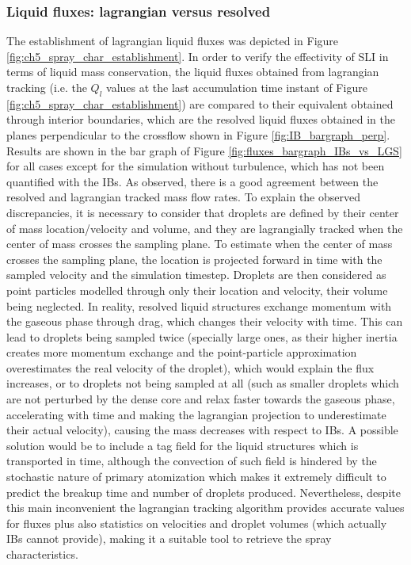 \subsubsection*{Liquid fluxes: lagrangian versus resolved}
\label{subsec:ch5_sli_fluxes_vs_IBs}

The establishment of lagrangian liquid fluxes was depicted in Figure \ref{fig:ch5_spray_char_establishment}. In order to verify the effectivity of SLI in terms of liquid mass conservation, the liquid fluxes obtained from lagrangian tracking (i.e. the $Q_l$ values at the last accumulation time instant of Figure \ref{fig:ch5_spray_char_establishment}) are compared to their equivalent obtained through interior boundaries, which are the resolved liquid fluxes obtained in the planes perpendicular to the crossflow shown in Figure \ref{fig:IB_bargraph_perp}. Results are shown in the bar graph of Figure \ref{fig:fluxes_bargraph_IBs_vs_LGS} for all cases except for the simulation without turbulence, which has not been quantified with the IBs. As observed, there is a good agreement between the resolved and lagrangian tracked mass flow rates. To explain the observed discrepancies, it is necessary to consider that droplets are defined by their center of mass location/velocity and volume, and they are lagrangially tracked when the center of mass crosses the sampling plane. To estimate when the center of mass crosses the sampling plane, the location is projected forward in time with the sampled velocity and the simulation timestep. Droplets are then considered as point particles modelled through only their location and velocity, their volume being neglected. In reality, resolved liquid structures exchange momentum with the gaseous phase through drag, which changes their velocity with time. This can lead to droplets being sampled twice (specially large ones, as their higher inertia creates more momentum exchange and the point-particle approximation overestimates the real velocity of the droplet), which would explain the flux increases, or to droplets not being sampled at all (such as smaller droplets which are not perturbed by the dense core and relax faster towards the gaseous phase, accelerating with time and making the lagrangian projection to underestimate their actual velocity), causing the mass decreases with respect to IBs. A possible solution would be to include a tag field for the liquid structures which is transported in time, although the convection of such field is hindered by the stochastic nature of primary atomization which makes it extremely difficult to predict the breakup time and number of droplets produced. Nevertheless, despite this main inconvenient the lagrangian tracking algorithm provides accurate values for fluxes plus also statistics on velocities and droplet volumes (which actually IBs cannot provide), making it a suitable tool to retrieve the spray characteristics. %




